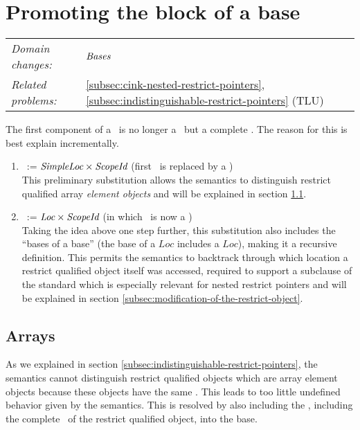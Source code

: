 \FloatBarrier 

\newpage

\section{Promoting the block of a base}\label{sec:promoting-block-of-a-base}
\vspace*{-\baselineskip}
\begin{table}[h]
\begin{tabular}{ll}
\textit{Domain changes:}   &  $\textit{Bases}$ \\
\textit{Related problems:} & \ref{subsec:cink-nested-restrict-pointers}, \ref{subsec:indistinguishable-restrict-pointers} (TLU)  \\
\end{tabular}
\end{table}

The first component of a \Base \ is no longer a \Block \ but a complete \Loc.
The reason for this is best explain incrementally.

\begin{enumerate}
    \item \Base \ := $\textit{SimpleLoc} \times \textit{ScopeId}$ (first \Block \ is replaced by a \Simpleloc) \\
    This preliminary substitution allows the semantics to distinguish restrict qualified array \textit{element objects}
    and will be explained in section \ref{subsec:promoting-the-block-of-a-base-arrays}.
    \item \Base \ := $\textit{Loc} \times \textit{ScopeId}$ (in which \Block \ is now a \Loc) \\
    Taking the idea above one step further, this substitution also includes the ``bases of a base'' (\ie the base 
    of a $Loc$ includes a $Loc$), making it a recursive definition. This permits the semantics to backtrack
    through which location a restrict qualified object itself was accessed, required to support a subclause of
    the standard which is especially relevant for nested restrict pointers and will be explained in
    section \ref{subsec:modification-of-the-restrict-object}.
\end{enumerate}

\subsection{Arrays}\label{subsec:promoting-the-block-of-a-base-arrays}
As we explained in section \ref{subsec:indistinguishable-restrict-pointers}, the semantics cannot distinguish
restrict qualified objects which are array element objects because these objects have the same \Block.
This leads to too little undefined behavior given by the \cink{} semantics.
This is resolved by also including the \Offset, \ie including the complete \Simpleloc \ of the restrict qualified
object, into the base.

